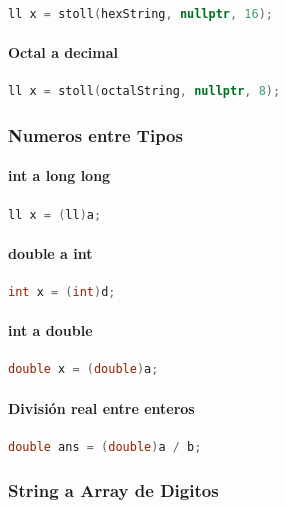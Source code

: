 \begin{lstlisting}[language=C++]
	ll x = stoll(hexString, nullptr, 16);
\end{lstlisting}

\paragraph{Octal a decimal}

\begin{lstlisting}[language=C++]
	ll x = stoll(octalString, nullptr, 8);
\end{lstlisting}

\subsubsection{Numeros entre Tipos}

\paragraph{int a long long}

\begin{lstlisting}[language=C++]
	ll x = (ll)a;
\end{lstlisting}

\paragraph{double a int}

\begin{lstlisting}[language=C++]
	int x = (int)d;
\end{lstlisting}

\paragraph{int a double}

\begin{lstlisting}[language=C++]
	double x = (double)a;
\end{lstlisting}

\paragraph{División real entre enteros}

\begin{lstlisting}[language=C++]
	double ans = (double)a / b;
\end{lstlisting}

\subsubsection{String a Array de Digitos}

